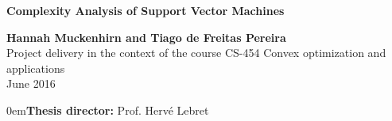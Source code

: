 \begin{titlepage}


\begin{center}
\begin{figure}[hbtp]
\begin{center}
{
	\bf {}
}
\end{center}
\end{figure}

\vspace{3cm}
{\LARGE{{\bf{Complexity Analysis of Support Vector Machines}}}}
\vspace{2cm}

{\large {\bf{Hannah Muckenhirn and Tiago de Freitas Pereira}}} \\
\vspace{2cm}
{\large Project delivery in the context of the course CS-454 Convex optimization and applications
\\
	June 2016}
\vspace{1cm}
\end{center}


{\parindent0em{\large{\bf{Thesis director:}}  Prof. Herv\'e Lebret\\}}


\end{titlepage}
